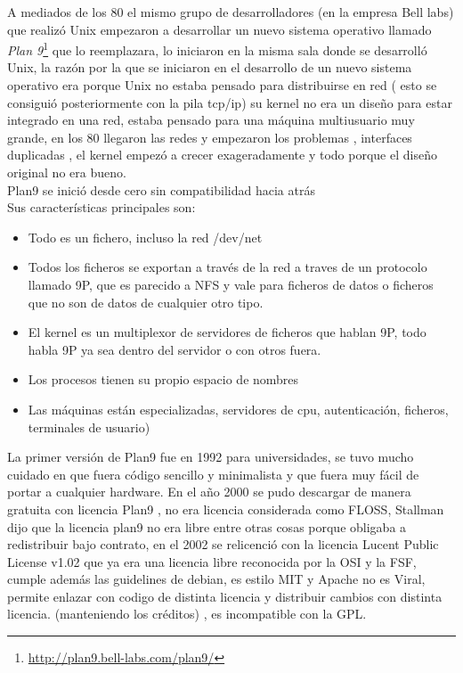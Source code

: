 \documentclass[a4paper,oneside,11pt]{article}
\begin{document}
A mediados de los 80 el mismo grupo de desarrolladores (en la empresa Bell labs) que realiz\'o Unix empezaron a desarrollar un nuevo sistema operativo llamado
\emph{Plan 9}\footnote{\url{http://plan9.bell-labs.com/plan9/}} que lo reemplazara, lo iniciaron en la misma sala donde se desarroll\'o Unix, la raz\'on por la que se iniciaron en el desarrollo
de un nuevo sistema operativo era porque Unix no estaba pensado para distribuirse en red ( esto se consigui\'o posteriormente con la pila tcp/ip)
su kernel no era un diseño para estar integrado en una red, estaba pensado para una m\'aquina
multiusuario muy grande, en los 80 llegaron las redes y empezaron los problemas , interfaces duplicadas , el kernel empez\'o a crecer exageradamente y todo porque el 
diseño original no era bueno.
\\
Plan9 se inici\'o desde cero sin compatibilidad hacia atr\'as
\\
Sus caracter\'isticas principales son:

\begin{itemize}  
	\item Todo es un fichero, incluso la red /dev/net
	\item Todos los ficheros se exportan a trav\'es de la red a traves de un protocolo llamado 9P, que es parecido
	 a NFS y vale para ficheros de datos o ficheros que no son de datos de cualquier otro tipo. 
	\item El kernel es un multiplexor de servidores  de ficheros que hablan  9P, todo habla 9P ya sea dentro del
	 servidor o con otros fuera.
	\item Los procesos tienen su propio espacio de nombres
	\item Las m\'aquinas están especializadas, servidores de cpu, autenticaci\'on, ficheros, terminales de usuario)
\end{itemize}

La primer versi\'on de Plan9 fue en 1992 para universidades, se tuvo mucho cuidado en que fuera c\'odigo sencillo
y minimalista y que fuera muy f\'acil de portar a cualquier hardware.
En el año 2000 se pudo descargar de manera gratuita con licencia Plan9 , no era licencia considerada
como FLOSS, Stallman dijo que la licencia plan9 no era libre entre otras cosas porque obligaba
a redistribuir bajo contrato, en el 2002 se relicenci\'o con la licencia Lucent Public License v1.02 que ya era 
una licencia libre reconocida por la OSI y la FSF, cumple adem\'as las guidelines de debian,
 es estilo MIT y Apache no es Viral, permite enlazar con codigo de
 distinta licencia y distribuir cambios con distinta licencia. (manteniendo los cr\'editos) ,
  es incompatible con la GPL.
\end{document}
